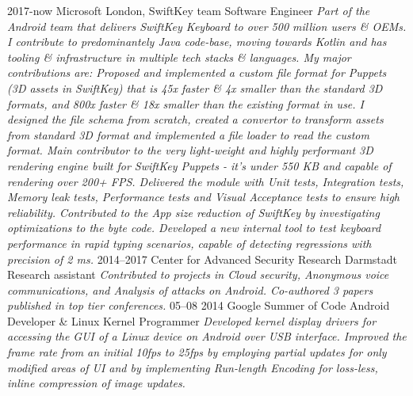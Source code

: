 \documentclass[]{friggeri-cv}
\begin{document}
    \begin{entrylist}
        \entry
            {2017-now}
            {Microsoft London, SwiftKey team}
            {Software Engineer}
            {\emph{Part of the Android team that delivers SwiftKey Keyboard to over 500 million users \& OEMs. I contribute to predominantely Java code-base, moving towards Kotlin and has tooling \& infrastructure in multiple tech stacks \& languages. My major contributions are: 
	    \newline 
	    \newline
	    Proposed and implemented a custom file format for Puppets (3D assets in SwiftKey) that is 45x faster \& 4x smaller than the standard 3D formats, and 800x faster \& 18x smaller than the existing format in use. I designed the file schema from scratch, created a convertor to transform assets from standard 3D format and implemented a file loader to read the custom format.
            \newline
            \newline
	    Main contributor to the very light-weight and highly performant 3D rendering engine built for SwiftKey Puppets - it's under 550 KB and capable of rendering over 200+ FPS. Delivered the module with Unit tests, Integration tests, Memory leak tests, Performance tests and Visual Acceptance tests to ensure high reliability.   
            \newline
            \newline
            Contributed to the App size reduction of SwiftKey by investigating optimizations to the byte code. Developed a new internal tool to test keyboard performance in rapid typing scenarios, capable of detecting regressions with precision of 2 ms. }}
        \entry
            {2014–2017}
            {Center for Advanced Security Research Darmstadt}
            {Research assistant}
            {\emph{Contributed to projects in Cloud security, Anonymous voice communications, and Analysis of attacks on Android. Co-authored 3 papers published in top tier conferences.}}
        \entry
            {05–08 2014}
            {Google Summer of Code}
            {Android Developer \& Linux Kernel Programmer}
            {\emph{Developed kernel display drivers for accessing the GUI of a Linux device on Android over USB interface. Improved the frame rate from an initial 10fps to 25fps by employing partial updates for only modified areas of UI and by implementing Run-length Encoding for loss-less, inline compression of image updates.}}
    \end{entrylist}
\end{document}
